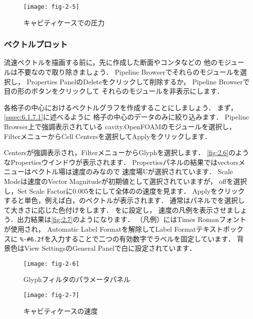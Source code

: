 \begin{figure}[ht]
 \texttt{[image: fig-2-5]}
 \caption{キャビティケースでの圧力}
 \label{fig:2.5}
\end{figure}


\subsubsection{ベクトルプロット}
\label{sssec:2.1.4.2}
流速ベクトルを描画する前に，先に作成した断面やコンタなどの
他のモジュールは不要なので取り除きましょう．
Pipeline Browserでそれらのモジュールを選択し，
Properties PanelのDeleteをクリックして削除するか，
Pipeline Browserで目の形のボタンをクリックして
それらのモジュールを非表示にします．

各格子の中心におけるベクトルグラフを作成することにしましょう．
まず，\autoref{sssec:6.1.7.1}に述べるように
格子の中心のデータのみに絞り込みます．
Pipeline Browser上で強調表示されている
cavity.OpenFOAMのモジュールを選択し，
FilterメニューからCell Centersを選択してApplyをクリックします．

Centersが強調表示され，FilterメニューからGlyphを選択します．
\autoref{fig:2.6}のようなPropertiesウインドウが表示されます．
Propertiesパネルの結果ではvectorsメニューはベクトル場は速度のみなので
速度場Uが選択されています．
Scale Modeは速度のVector Magnitudeが初期値として選択されていますが，
offを選択し，Set Scale Factorに0.005をにして全体のの速度を見ます．
Applyをクリックすると単色，例えば白，のベクトルが表示されます．
通常はパネルでを選択して大きさに応じた色付けをします．
をに設定し，
速度の凡例を表示させましょう．出力結果は\autoref{fig:2.7}のようになります．
%
%
（凡例）にはTimes Romanフォントが使用され，
Automatic Label Formatを解除してLabel Formatテキストボックスに
\verb|%-#6.2f|を入力することで二つの有効数字でラベルを固定しています．
背景色はView SettingsのGeneral Panelで白に設定されています．


\begin{figure}[ht]
 \texttt{[image: fig-2-6]}
 \caption{Glyphフィルタのパラメータパネル}
 \label{fig:2.6}
\end{figure}


\begin{figure}[ht]
 \texttt{[image: fig-2-7]}
 \caption{キャビティケースの速度}
 \label{fig:2.7}
\end{figure}


